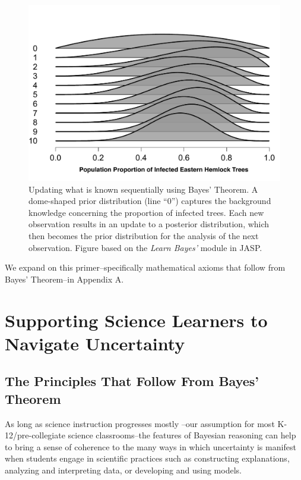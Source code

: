 \documentclass[man, floatsintext]{apa7} %
\begin{document}
\begin{figure}[h]
\begin{center}
\includegraphics[width = .65\paperwidth]{WindowsMacSequential.pdf}
\caption{Updating what is known sequentially using Bayes' Theorem. A dome-shaped prior distribution (line ``0'') captures the background knowledge concerning the proportion of infected trees. Each new observation results in an update to a posterior distribution, which then becomes the prior distribution for the analysis of the next observation. Figure based on the \emph{Learn Bayes'} module in JASP.}
\label{fig:WindowsMacSequential}
\end{center}
\end{figure}

We expand on this primer--specifically mathematical axioms that follow from Bayes' Theorem--in Appendix A.

\section{Supporting Science Learners to Navigate Uncertainty}

\subsection{The Principles That Follow From Bayes' Theorem}

As long as science instruction progresses mostly --our assumption for most K-12/pre-collegiate science classrooms--the features of Bayesian reasoning can help to bring a sense of coherence to the many ways in which uncertainty is manifest when students engage in scientific practices such as constructing explanations, analyzing and interpreting data, or developing and using models. \\
\end{document}
